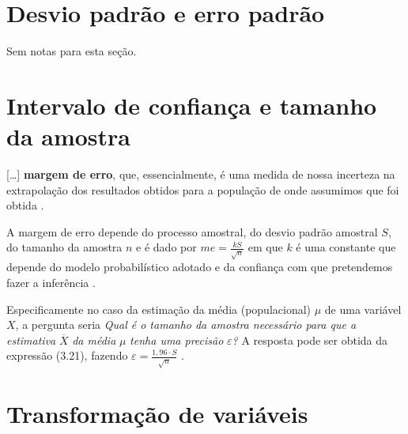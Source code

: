 \documentclass[
]{latex/krantz}
\renewenvironment{quote}{\begin{VF}}{\end{VF}}
\theoremstyle{definition}
\theoremstyle{definition}
\theoremstyle{definition}
\theoremstyle{definition}
\theoremstyle{remark}
\begin{document}
\hypertarget{desvio-padruxe3o-e-erro-padruxe3o}{%
\section{Desvio padrão e erro padrão}\label{desvio-padruxe3o-e-erro-padruxe3o}}

Sem notas para esta seção.

\hypertarget{intervalo-de-confianuxe7a-e-tamanho-da-amostra}{%
\section{Intervalo de confiança e tamanho da amostra}\label{intervalo-de-confianuxe7a-e-tamanho-da-amostra}}

\begin{quote}
{[}\ldots{]} \textbf{margem de erro}, que, essencialmente, é uma medida de nossa incerteza na extrapolação dos resultados obtidos para a população de onde assumimos que foi obtida \citep[p.~65]{MorettinSinger2022}.
\end{quote}

\begin{quote}
A margem de erro depende do processo amostral, do desvio padrão amostral \(S\), do tamanho da amostra \(n\) e é dado por \(me = \frac{kS}{\sqrt{n}}\) em que \(k\) é uma constante que depende do modelo probabilístico adotado e da confiança com que pretendemos fazer a inferência \citep[p.~65]{MorettinSinger2022}.
\end{quote}

\begin{quote}
Especificamente no caso da estimação da média (populacional) \(\mu\) de uma variável \(X\), a pergunta seria \emph{Qual é o tamanho da amostra necessário para que a estimativa} \(\overline{X}\) \emph{da média} \(\mu\) \emph{tenha uma precisão} \(\varepsilon\)\emph{?} A resposta pode ser obtida da expressão (3.21), fazendo \(\varepsilon = \frac{1,96 \cdot S}{\sqrt{n}}\) \citep[p.~66]{MorettinSinger2022}.
\end{quote}

\hypertarget{transformauxe7uxe3o-de-variuxe1veis}{%
\section{Transformação de variáveis}\label{transformauxe7uxe3o-de-variuxe1veis}}
\end{document}
